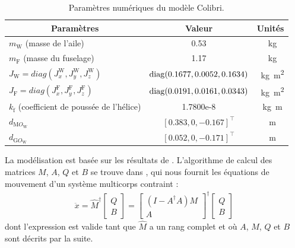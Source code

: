 \begin{table}[ht]
  \centering
    \begin{tabular}{|l|c|c|}
      \hline
      \multicolumn{1}{|c|}{Paramètres} & Valeur & Unités  \\
      \hline
      $m_{\text{W}}$ (masse de l'aile)  & 0.53& \SI{}{\kilogram} \\
      \hline
      $m_{\text{F}}$ (masse du fuselage)  & 1.17& \SI{}{\kilogram} \\
      \hline
      $J_{\text{W}}=diag(J_{x}^{\text{W}}, J_{y}^{\text{W}}, J_{z}^{\text{W}})$ & \!\! $\operatorname{diag}(0.1677,0.0052,0.1634)$\!\! & \SI{}{\kilogram\square\meter}\\
      \hline
      $J_{\text{F}}=diag(J_{x}^{\text{F}}, J_{y}^{\text{F}}, J_{z}^{\text{F}})$ & \!\! $\operatorname{diag}(0.0191,0.0161,0.0343)$\!\! & \SI{}{\kilogram\square\meter}\\
      \hline
      $k_{\text{f}}$ (coefficient de poussée de l'hélice) & 1.7800e-8 & \SI{}{\kilogram\meter}\\
      \hline
       $d_{\text{M}O_{\text{W}}}$  & $[0.383,0,-0.167]^\top$ & \SI{}{\meter}\\
      \hline
       $d_{\text{G}O_{\text{W}}}$  & $[0.052,0,-0.171]^\top$ & \SI{}{\meter}\\
      \hline
    \end{tabular}
    \caption{Paramètres numériques du modèle Colibri.}
    \label{tab:pars_colibri}
\end{table}


La modélisation est basée sur les résultats de \cite[Section 2.15]{udwadia-phohomsiri}. L'algorithme de calcul des matrices $M$, $A$, $Q$ et $B$ se trouve dans \cite{udwadia-schutte}, qui nous fournit les équations de mouvement d'un système multicorps contraint : 
\begin{align}
\label{eq:udwadia}
    \ddot{x} = \hat{M}^{\dag} \begin{bmatrix} Q \\ B \end{bmatrix}  = \begin{bmatrix} (I - A^{\dag}A)M \\ A \end{bmatrix}^{\dag} \begin{bmatrix} Q \\ B \end{bmatrix}
\end{align}
dont l'expression est valide tant que $\hat{M}$ a un rang complet et où $A$, $M$, $Q$ et $B$ sont décrits par la suite.

